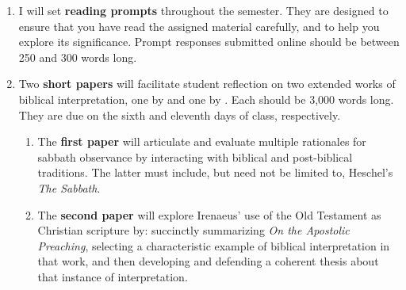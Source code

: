 \documentclass[titlepage]{article}
\begin{document}
\begin{enumerate}

	\item I will set \textbf{reading prompts} throughout the semester.
	They are designed to ensure that you have read the assigned material
	carefully, and to help you explore its significance. Prompt
	responses submitted online should be between 250 and 300 words long.


	\item Two \textbf{short papers} will facilitate student reflection
	on two extended works of biblical interpretation, one by
	\cite{heschel} and one by \cite{irenaeus}. Each should be 3,000
	words long. They are due on the sixth and eleventh days of class,
	respectively.

	\begin{enumerate}

		\item The \textbf{first paper} will articulate and evaluate
		multiple rationales for sabbath observance by interacting with
		biblical and post-biblical traditions. The latter must include,
		but need not be limited to, Heschel's \emph{The Sabbath}.

		\item The \textbf{second paper} will explore Irenaeus' use of
		the Old Testament as Christian scripture by: succinctly
		summarizing \emph{On the Apostolic Preaching}, selecting a
		characteristic example of biblical interpretation in that work,
		and then developing and defending a coherent thesis about that
		instance of interpretation.

	\end{enumerate}


\end{enumerate}
\end{document}
